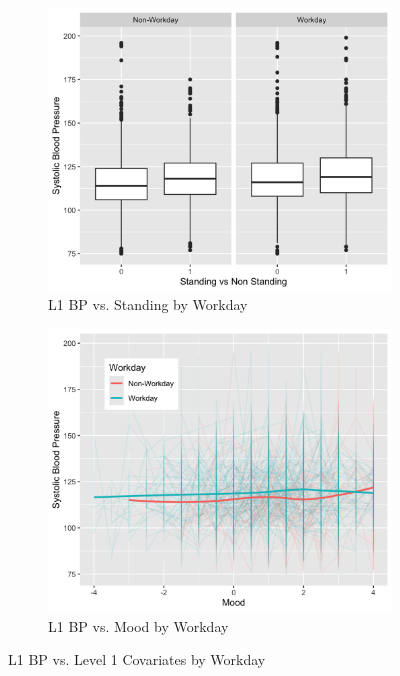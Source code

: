 \documentclass[12pt,twoside,leqno,fleqn,letterpaper]{article}
\theoremstyle{definition}
\theoremstyle{definition}
\begin{document}
\begin{figure}
    \begin{subfigure}{0.48\textwidth}
        \centering
        \includegraphics[width=\textwidth]{pics/bp v stand and day.png}
        \caption{{\small L1 BP vs. Standing by Workday}}
        \label{fig: bp v stand and day}
    \end{subfigure}
    \hfill
    \begin{subfigure}{0.48\textwidth}
        \centering
        \includegraphics[width=\textwidth]{pics/bp v mood and day.png}
        \caption{{\small L1 BP vs. Mood by Workday}}
        \label{fig: bp v mood and day}
    \end{subfigure}
    \caption{{\small L1 BP vs. Level 1 Covariates by Workday}}
    \label{fig: bp v level1 and day2}
\end{figure}
\end{document}
